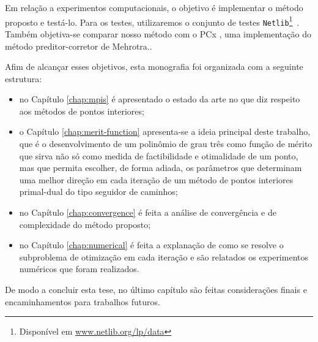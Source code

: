 Em relação a experimentos computacionais, o objetivo é implementar o método proposto e testá-lo. Para os testes, utilizaremos o conjunto de testes \texttt{Netlib}\footnote{Disponível em \url{www.netlib.org/lp/data}}~\cite{Dongarra:1987jk,Gay:1985ts}. Também objetiva-se comparar nosso método com o PCx \cite{Czyzyk:1999hk}, uma implementação do método preditor-corretor de Mehrotra.. 



Afim de alcançar  esses objetivos, esta monografia foi organizada com a seguinte estrutura: 

\begin{itemize}
	\item no Capítulo \ref{chap:mpis} é apresentado o estado da arte no
que diz respeito aos métodos de pontos interiores; 
\item o Capítulo \ref{chap:merit-function} apresenta-se a ideia principal deste trabalho, que é o
desenvolvimento de um polinômio de grau três como função de mérito  que sirva não só como medida
de factibilidade e otimalidade de um ponto, mas que permita escolher, de forma
adiada, os parâmetros que determinam uma melhor direção em cada iteração
de um método de pontos interiores primal-dual do tipo seguidor de caminhos; 
\item no Capítulo \ref{chap:convergence} é feita a análise de convergência e de complexidade do método proposto; 
\item no Capítulo \ref{chap:numerical} é feita a explanação de como se resolve o subproblema de otimização em cada iteração e são relatados os experimentos numéricos que foram realizados.


\end{itemize}

 De modo a  concluir esta tese, no último capítulo são feitas considerações finais e encaminhamentos para trabalhos futuros.

